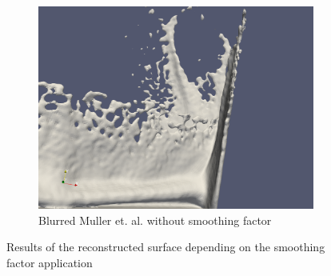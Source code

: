 \begin{figure}
\begin{center}
\begin{subfigure}[b]{0.7\textwidth}
			\includegraphics[width=\textwidth]{figures/BlurSmoothingFactorNonepng.png}
			\caption{Blurred Muller et. al. without smoothing factor}
		\end{subfigure}

	\end{center}
	\caption{Results of the reconstructed surface depending on the smoothing factor application}
	\label{fig:smoothing_factor_influence}
\end{figure}


